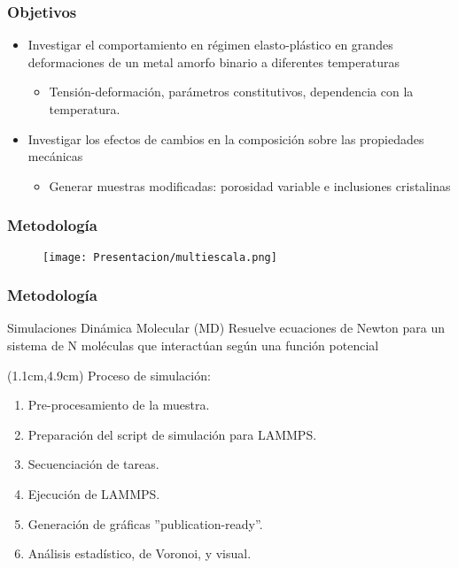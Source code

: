 \begin{frame}
 \frametitle{Objetivos}
 \vspace{0.5cm}
\begin{itemize}
 \item Investigar el comportamiento en r\'egimen elasto-pl\'astico en grandes deformaciones de un metal amorfo binario a diferentes temperaturas
 \begin{itemize}
  \item Tensión-deformación, parámetros constitutivos, dependencia con la temperatura.
 \end{itemize}
 \vspace{0.3cm}
 \item Investigar los efectos de cambios en la composici\'on sobre las propiedades mec\'anicas
 \begin{itemize}
  \item Generar muestras modificadas: porosidad variable e inclusiones cristalinas
 \end{itemize}
\end{itemize}
\end{frame}

\begin{frame}
 \frametitle{Metodología}
 \begin{figure}
  \centering
  \texttt{[image: Presentacion/multiescala.png]}
 \end{figure}

\end{frame}

\begin{frame}
 \frametitle{Metodología}
 \begin{block}{Simulaciones Din\'amica Molecular (MD)}
  Resuelve ecuaciones de Newton para un sistema de N mol\'eculas que interact\'uan seg\'un una funci\'on potencial
 \end{block}
 \begin{textblock*}{12cm}(1.1cm,4.9cm)
  Proceso de simulación:
  \begin{enumerate}
   \item Pre-procesamiento de la muestra.
   \item Preparación del script de simulación para LAMMPS.
   \item Secuenciación de tareas.
   \item Ejecución de LAMMPS.
   \item Generación de gráficas ''publication-ready''.
   \item Análisis estadístico, de Voronoi, y visual.
  \end{enumerate}
 \end{textblock*}
\end{frame}
